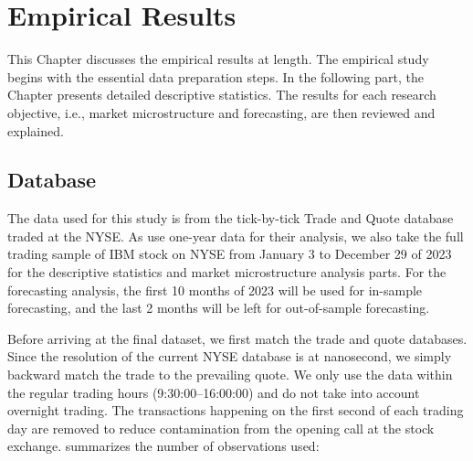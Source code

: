 \chapter{Empirical Results}\label{chap:mainresults}

This Chapter discusses the empirical results at length. The empirical study begins with the essential data preparation steps. In the following part, the Chapter presents detailed descriptive statistics. The results for each research objective, i.e., market microstructure and forecasting, are then reviewed and explained.

\section{Database}

The data used for this study is from the tick-by-tick Trade and Quote database traded at the NYSE. As \citet{hausman1992} use one-year data for their analysis, we also take the full trading sample of IBM stock on NYSE from January 3 to December 29 of 2023 for the descriptive statistics and market microstructure analysis parts. For the forecasting analysis, the first 10 months of 2023 will be used for in-sample forecasting, and the last 2 months will be left for out-of-sample forecasting.

Before arriving at the final dataset, we first match the trade and quote databases. Since the resolution of the current NYSE database is at nanosecond, we simply backward match the trade to the prevailing quote. We only use the data within the regular trading hours (9:30:00–16:00:00) and do not take into account overnight trading. The transactions happening on the first second of each trading day are removed to reduce contamination from the opening call at the stock exchange.  summarizes the number of observations used:

\begin{table}[ht]
\centering
\small
\renewcommand{\arraystretch}{1.3} %
\setlength{\tabcolsep}{10pt} %
\caption{Summary of Database: IBM traded on NYSE, 2023.}
\label{tab:table-2}
\end{table}


